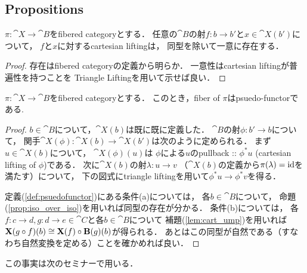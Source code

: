 \documentclass[a4paper, dvipdfmx]{jsarticle}
\begin{document}
\subsection{Propositions}
\begin{Lemma} \label{lem:cart_ump}
    $\pi \colon \cat{X} \to \cat{B}$をfibered categoryとする．
    任意の$\cat{B}$の射$f \colon b \to b'$と$x \in \cat{X}(b')$について，
    $f$と$x$に対するcartesian liftingは，
    同型を除いて一意に存在する．
\end{Lemma}
\begin{proof}
    存在はfibered categoryの定義から明らか．
    一意性はcartesian liftingが普遍性を持つことを
    Triangle Liftingを用いて示せば良い．
\end{proof}

\begin{Lemma}
    $\pi \colon \cat{X} \to \cat{B}$をfibered categoryとする．
    このとき，fiber of $\pi$はpsuedo-functorである.
\end{Lemma}
\begin{proof}
    $b \in \cat{B}$について，$\cat{X}(b)$は既に既に定義した．
    $\cat{B}$の射$\phi \colon b' \to b$について，
    関手$\cat{X}(\phi) \colon \cat{X}(b) \to \cat{X}(b')$は次のように定められる．
    まず$u \in \cat{X}(b)$について，
    $\cat{X}(\phi)(u)$は
    $\phi$による$u$のpullback :: $\phi^* u$ (cartesian lifting of $\phi$)である．
    次に$\cat{X}(b)$の射$\lambda \colon u \to v$
    （$\cat{X}(b)$の定義から$\pi(\lambda)=\mathrm{id}_{\!}$を満たす）について，
    下の図式にtriangle liftingを用いて$\phi^*u \to \phi^*v$を得る．
    \begin{center}
    \end{center}

    定義(\ref{def:psuedofunctor})にある条件(a)については，
    各$b \in \cat{B}$について，
    命題(\ref{prop:iso_over_iso})を用いれば同型の存在が分かる．
    条件(b)については，
    各$f \colon c \to d, g \colon d \to e \in \cat{C}$と各$b \in \cat{B}$について
    補題(\ref{lem:cart_ump})を用いれば
    $\mathbf{X}(g \circ f)(b) \cong \mathbf{X}(f) \circ \mathbf{B}(g)(b)$が得られる．
    あとはこの同型が自然である（すなわち自然変換を定める）ことを確かめれば良い．
\end{proof}
この事実は次のセミナーで用いる．
\end{document}
